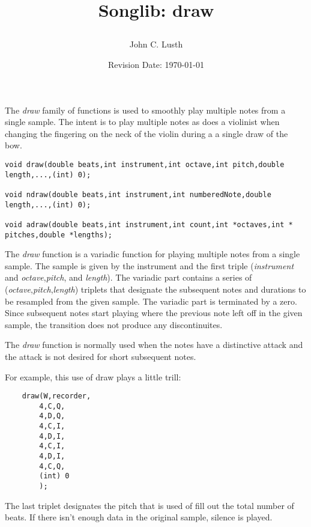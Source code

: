 \documentclass{article}
\title{Songlib: draw\\
\date{Revision Date: \today}}
\author{John C. Lusth}
\begin{document}
\maketitle

\W\subsubsection*{}
\W\htmlrule

The {\it draw} family of functions is used to smoothly play multiple notes
from a single sample. The intent is to play multiple notes as does
a violinist when changing the fingering on the neck of the
violin during a
a single draw of the bow.

\begin{verbatim}
void draw(double beats,int instrument,int octave,int pitch,double length,...,(int) 0);

void ndraw(double beats,int instrument,int numberedNote,double length,...,(int) 0);

void adraw(double beats,int instrument,int count,int *octaves,int * pitches,double *lengths);
\end{verbatim}

The {\it draw} function is a variadic function for playing multiple notes
from a single sample.
The sample is given by the instrument and the first triple
({\it instrument} and {\it octave},{\it pitch}, and {\it length}).
The variadic part contains
a series of ({\it octave},{\it pitch},{\it length}) triplets that
designate the subsequent notes and durations to be resampled from the
given sample. The variadic part is terminated by a zero.
Since subsequent notes 
start playing where the previous note left off in the
given sample, the transition does not produce any
discontinuites. 

The {\it draw} function is normally used when the notes have a distinctive
attack and the attack is not desired for short subsequent notes.

For example, this use of draw plays a little trill:

\begin{verbatim}
    draw(W,recorder,
        4,C,Q,
        4,D,Q,
        4,C,I,
        4,D,I,
        4,C,I,
        4,D,I,
        4,C,Q,
        (int) 0
        );
\end{verbatim}

The last triplet designates the pitch that is used of fill out the
total number of beats.
If there isn't enough data in the original sample, silence is played.
\end{document}
